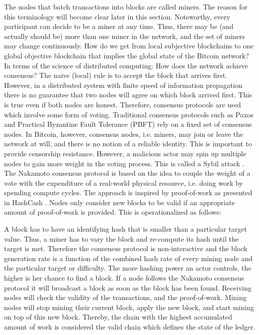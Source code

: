 The nodes that batch transactions into blocks are called miners. The reason for this terminology will become clear later in this section. Noteworthy, every participant can decide to be a miner at any time. Thus, there may be (and actually should be) more than one miner in the network, and the set of miners may change continuously. How do we get from local subjective blockchains to one global objective blockchain that implies the global state of the Bitcoin network? In terms of the science of distributed computing: How does the network achieve consensus? 
The naive (local) rule is to accept the block that arrives first. However, in a distributed system with finite speed of information propagation there is no guarantee that two nodes will agree on which block arrived first. This is true even if both nodes are honest. Therefore, consensus protocols are used which involve some form of voting. Traditional consensus protocols such as Paxos \parencite{lamport2001paxos} and Practical Byzantine Fault Tolerance (PBFT) \parencite{castro1999practical} rely on a fixed set of consensus nodes. 
 In Bitcoin, however, consensus nodes, i.e. miners, may join or leave the network at will, and there is no notion of a reliable identity. This is important to provide censorship resistance. However, a malicious actor may spin up multiple nodes to gain more weight in the voting process. This is called a Sybil attack \parencite{douceur2002sybil}. The Nakamoto consensus protocol is based on the idea to couple the weight of a vote with the expenditure of a real-world physical resource, i.e. doing work by spending compute cycles. The approach is inspired by proof-of-work as presented in HashCash \parencite{back2002hashcash}. Nodes only consider new blocks to be valid if an appropriate amount of proof-of-work is provided. This is operationalized as follows:

A block has to have an identifying hash that is smaller than a particular target value. Thus, a miner has to vary the block and re-compute its hash until the target is met. Therefore the consensus protocol is non-interactive and the block generation rate is a function of the combined hash rate of every mining node and the particular target or difficulty. The more hashing power an actor controls, the higher is her chance to find a block. If a node follows the Nakamoto consensus protocol it will broadcast a block as soon as the block has been found. Receiving nodes will check the validity of the transactions, and the proof-of-work. Mining nodes will stop mining their current block, apply the new block, and start mining on top of this new block. Thereby, the chain with the highest accumulated amount of work is considered the valid chain which defines the state of the ledger. 

